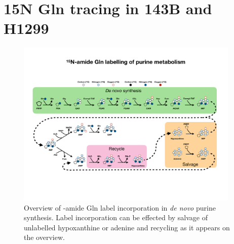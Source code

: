 \section{15N Gln tracing in 143B and H1299}
\begin{figure}[ht]
    \centering
    \includegraphics[width=0.95\textwidth]{figures/chap2/app/purine_tracing_overvew.pdf}
    \caption[Purine metabolism \hNi-amide Gln tracing overview.]{
    Overview of \hNi-amide Gln label incorporation in \textit{de novo} purine synthesis.
    Label incorporation can be effected by salvage of unlabelled hypoxanthine or adenine and recycling as it appears on the overview.
    }
    \label{fig:app_ch2:pur_tr_ov}
\end{figure}

